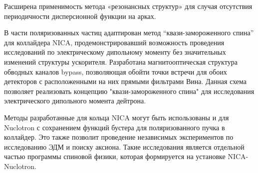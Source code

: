 \par Расширена применимость метода «резонансных структур» для случая отсутствия периодичности дисперсионной функции на арках.

\par В части поляризованных частиц адаптирован метод “квази-замороженного спина” для коллайдера NICA, продемонстрировавший возможность проведения исследований по электрическому дипольному моменту без значительных изменений структуры ускорителя. Разработана магнитооптическая структура обводных каналов bypass, позволяющая обойти точки встречи для обоих детекторов с расположенными на них прямыми фильтрами Вина. Данная схема позволяет реализовать концепцию "квази-замороженного спина" для исследования электрического дипольного момента дейтрона. 

\par Методы разработанные для кольца NICA могут быть использованы и для Nuclotron с сохранением функций бустера для поляризованного пучка в коллайдер. Это также позволит проведение независимых экспериментов по исследованию ЭДМ и поиску аксиона. Такие исследования является отдельной частью программы спиновой физики, которая формируется на уста­новке NICA-Nuclotron.


